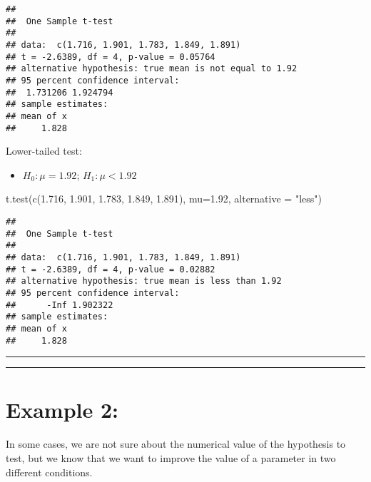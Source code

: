 \documentclass[
]{book}
\newenvironment{Shaded}{\begin{snugshade}}{\end{snugshade}}
\newcommand{\AttributeTok}[1]{\textcolor[rgb]{0.77,0.63,0.00}{#1}}
\newcommand{\FloatTok}[1]{\textcolor[rgb]{0.00,0.00,0.81}{#1}}
\newcommand{\FunctionTok}[1]{\textcolor[rgb]{0.00,0.00,0.00}{#1}}
\newcommand{\NormalTok}[1]{#1}
\newcommand{\StringTok}[1]{\textcolor[rgb]{0.31,0.60,0.02}{#1}}
\providecommand{\tightlist}{%
  \setlength{\itemsep}{0pt}\setlength{\parskip}{0pt}}
\begin{document}
\begin{verbatim}
## 
##  One Sample t-test
## 
## data:  c(1.716, 1.901, 1.783, 1.849, 1.891)
## t = -2.6389, df = 4, p-value = 0.05764
## alternative hypothesis: true mean is not equal to 1.92
## 95 percent confidence interval:
##  1.731206 1.924794
## sample estimates:
## mean of x 
##     1.828
\end{verbatim}

Lower-tailed test:

\begin{itemize}
\tightlist
\item
  \(H_0:\mu=1.92\); \(H_1:\mu < 1.92\)
\end{itemize}

\begin{Shaded}
\begin{Highlighting}[]
\FunctionTok{t.test}\NormalTok{(}\FunctionTok{c}\NormalTok{(}\FloatTok{1.716}\NormalTok{, }\FloatTok{1.901}\NormalTok{, }\FloatTok{1.783}\NormalTok{, }\FloatTok{1.849}\NormalTok{, }\FloatTok{1.891}\NormalTok{), }
       \AttributeTok{mu=}\FloatTok{1.92}\NormalTok{, }\AttributeTok{alternative =} \StringTok{"less"}\NormalTok{)}
\end{Highlighting}
\end{Shaded}

\begin{verbatim}
## 
##  One Sample t-test
## 
## data:  c(1.716, 1.901, 1.783, 1.849, 1.891)
## t = -2.6389, df = 4, p-value = 0.02882
## alternative hypothesis: true mean is less than 1.92
## 95 percent confidence interval:
##      -Inf 1.902322
## sample estimates:
## mean of x 
##     1.828
\end{verbatim}

\begin{center}\rule{0.5\linewidth}{0.5pt}\end{center}

\begin{center}\rule{0.5\linewidth}{0.5pt}\end{center}

\hypertarget{example-2-3}{%
\section{Example 2:}\label{example-2-3}}

In some cases, we are not sure about the numerical value of the hypothesis to test, but we know that we want to improve the value of a parameter in two different conditions.
\end{document}
